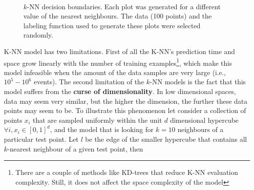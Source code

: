 \begin{figure}[!h]
   \centering
   \quad
   \\
   \quad
   \caption{$k$-NN decision boundaries. Each plot was generated for a different value of the nearest neighbours. The data (100 points) and the labeling function used to generate these plots were selected randomly.
   \label{fig:knn decision boundary}}
\end{figure}

K-NN model has two limitations. First of all the K-NN's prediction time and space grow linearly with the number of training examples\footnote{There are a couple of methods like KD-trees that reduce K-NN evaluation complexity. Still, it does not affect the space complexity of the model}, which make this model infeasible when the amount of the data samples are very large (i.e., $10^{5} - 10^{6}$ events). The second limitation of the $k$-NN models is the fact that this model suffers from the\textbf{ curse of dimensionality}.  In low dimensional spaces, data may seem very similar, but the higher the dimension, the further these data points may seem to be. To illustrate this phenomenon let consider a collection of points $x_i$ that are sampled uniformly within the unit  $d$ dimensional hypercube $\forall i, x_i \in [0,1]^{d} $, and the model that is looking for $k=10$ neighbours of a particular test point. Let $l$ be the edge of the smaller hypercube that contains all $k$-nearest neighbour of a given test point, then 


